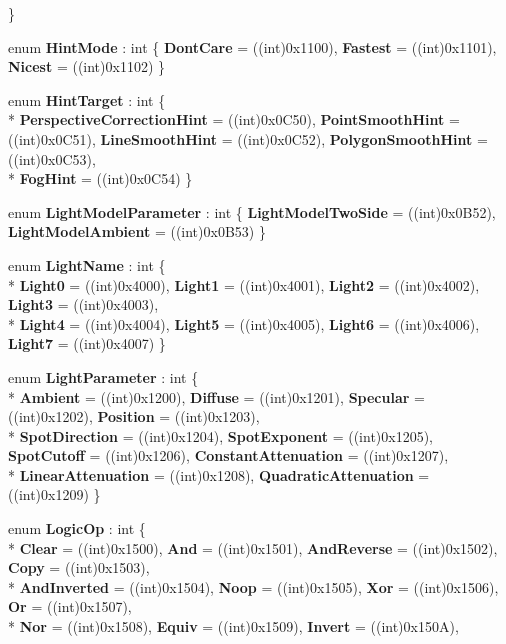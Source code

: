 \begin{DoxyCompactItemize}
 \}
\item 
enum {\bfseries Hint\-Mode} \-: int \{ {\bfseries Dont\-Care} = ((int)0x1100), 
{\bfseries Fastest} = ((int)0x1101), 
{\bfseries Nicest} = ((int)0x1102)
 \}
\item 
enum {\bfseries Hint\-Target} \-: int \{ \\*
{\bfseries Perspective\-Correction\-Hint} = ((int)0x0\-C50), 
{\bfseries Point\-Smooth\-Hint} = ((int)0x0\-C51), 
{\bfseries Line\-Smooth\-Hint} = ((int)0x0\-C52), 
{\bfseries Polygon\-Smooth\-Hint} = ((int)0x0\-C53), 
\\*
{\bfseries Fog\-Hint} = ((int)0x0\-C54)
 \}
\item 
enum {\bfseries Light\-Model\-Parameter} \-: int \{ {\bfseries Light\-Model\-Two\-Side} = ((int)0x0\-B52), 
{\bfseries Light\-Model\-Ambient} = ((int)0x0\-B53)
 \}
\item 
enum {\bfseries Light\-Name} \-: int \{ \\*
{\bfseries Light0} = ((int)0x4000), 
{\bfseries Light1} = ((int)0x4001), 
{\bfseries Light2} = ((int)0x4002), 
{\bfseries Light3} = ((int)0x4003), 
\\*
{\bfseries Light4} = ((int)0x4004), 
{\bfseries Light5} = ((int)0x4005), 
{\bfseries Light6} = ((int)0x4006), 
{\bfseries Light7} = ((int)0x4007)
 \}
\item 
enum {\bfseries Light\-Parameter} \-: int \{ \\*
{\bfseries Ambient} = ((int)0x1200), 
{\bfseries Diffuse} = ((int)0x1201), 
{\bfseries Specular} = ((int)0x1202), 
{\bfseries Position} = ((int)0x1203), 
\\*
{\bfseries Spot\-Direction} = ((int)0x1204), 
{\bfseries Spot\-Exponent} = ((int)0x1205), 
{\bfseries Spot\-Cutoff} = ((int)0x1206), 
{\bfseries Constant\-Attenuation} = ((int)0x1207), 
\\*
{\bfseries Linear\-Attenuation} = ((int)0x1208), 
{\bfseries Quadratic\-Attenuation} = ((int)0x1209)
 \}
\item 
enum {\bfseries Logic\-Op} \-: int \{ \\*
{\bfseries Clear} = ((int)0x1500), 
{\bfseries And} = ((int)0x1501), 
{\bfseries And\-Reverse} = ((int)0x1502), 
{\bfseries Copy} = ((int)0x1503), 
\\*
{\bfseries And\-Inverted} = ((int)0x1504), 
{\bfseries Noop} = ((int)0x1505), 
{\bfseries Xor} = ((int)0x1506), 
{\bfseries Or} = ((int)0x1507), 
\\*
{\bfseries Nor} = ((int)0x1508), 
{\bfseries Equiv} = ((int)0x1509), 
{\bfseries Invert} = ((int)0x150\-A), 

\end{DoxyCompactItemize}
